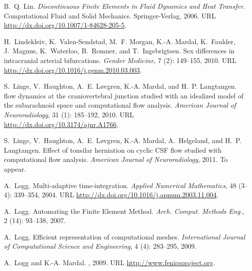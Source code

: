 \begin{thebibliography}{467}
B.~Q. Lin.
\newblock \emph{Discontinuous Finite Elements in Fluid Dynamics and Heat
  Transfer}.
\newblock Computational Fluid and Solid Mechanics. Springer-Verlag, 2006.
\newblock URL \url{http://dx.doi.org/10.1007/1-84628-205-5}.

H.~Lindekleiv, K.~Valen-Sendstad, M.~F. Morgan, K.-A. Mardal, K.~Faulder,
  J.~Magnus, K.~Waterloo, B.~Romner, and T.~Ingebrigtsen.
\newblock Sex differences in intracranial arterial bifurcations.
\newblock \emph{Gender Medicine}, 7 (2): 149--155, 2010.
\newblock URL \url{http://dx.doi.org/10.1016/j.genm.2010.03.003}.

S.~Linge, V.~Haughton, A.~E. L{\o}vgren, K.-A. Mardal, and H.~P. Langtangen.
 flow dynamics at the craniovertebral junction studied with an
  idealized model of the subarachnoid space and computational flow analysis.
\newblock \emph{American Journal of Neuroradiology}, 31 (1):
  185--192, 2010.
\newblock URL \url{http://dx.doi.org/10.3174/ajnr.A1766}.

S.~Linge, V.~Haughton, A.~E. L{\o}vgren, K.-A. Mardal, A.~Helgeland, and H.~P.
  Langtangen.
\newblock Effect of tonsilar herniation on cyclic {CSF} flow studied with
  computational flow analysis.
\newblock \emph{American Journal of Neuroradiology}, 2011.
\newblock To appear.

A.~Logg.
\newblock Multi-adaptive time-integration.
\newblock \emph{Applied Numerical Mathematics}, 48 (3--4):
  339--354, 2004.
\newblock URL \url{http://dx.doi.org/10.1016/j.apnum.2003.11.004}.

A.~Logg.
\newblock Automating the Finite Element Method.
\newblock \emph{Arch. Comput. Methods Eng.}, 2 (14): 93--138, 2007.

A.~Logg.
\newblock Efficient representation of computational meshes.
\newblock \emph{International Journal of Computational Science and
  Engineering}, 4 (4): 283--295, 2009.

A.~Logg and K.-A. Mardal.
, 2009.
\newblock URL \url{http://www.fenicsproject.org}.


\end{thebibliography}
